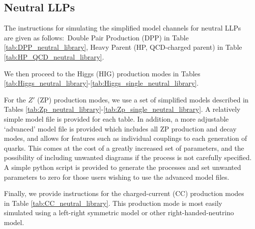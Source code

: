 \subsection{Neutral LLPs}

The instructions for simulating the simplified model channels for neutral LLPs are given as follows:~Double Pair Production (DPP) in Table \ref{tab:DPP_neutral_library}, Heavy Parent (HP, QCD-charged parent) in Table \ref{tab:HP_QCD_neutral_library}.

 We then proceed to the Higgs (HIG) production modes in Tables \ref{tab:Higgs_neutral_library}-\ref{tab:Higgs_single_neutral_library}.

For the $Z'$ (ZP) production modes, we use a set of simplified models described in Tables \ref{tab:Zp_neutral_library}-\ref{tab:Zp_single_neutral_library}. 
A relatively simple model file is provided for each table. In addition, a more adjustable `advanced' model file is provided which includes all ZP production and decay modes, and allows for features such as individual couplings to each generation of quarks. This comes at the cost of a greatly increased set of parameters, and the possibility of including unwanted diagrams if the process is not carefully specified. A simple python script is provided to generate the processes and set unwanted parameters to zero for those users wishing to use the advanced model files.


Finally, we provide instructions for the charged-current (CC) production modes in Table \ref{tab:CC_neutral_library}. This production mode is most easily simulated using a left-right symmetric model or other right-handed-neutrino model.

